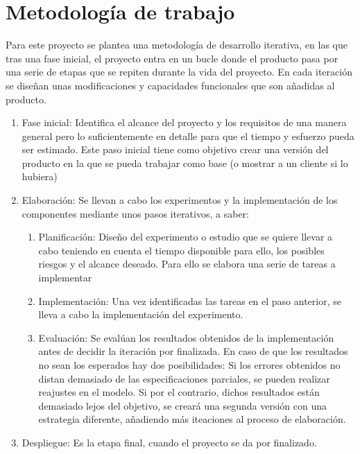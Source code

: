 \documentclass[11pt,a4paper,spanish]{book}
\begin{document}
	\section{Metodología de trabajo}
	Para este proyecto se plantea una metodología de desarrollo iterativa, en las que tras una fase inicial, el proyecto entra en un bucle donde el producto pasa por una serie de etapas que se repiten durante la vida del proyecto. En cada iteración se diseñan unas modificaciones y capacidades funcionales que son añadidas al producto.
	
	\begin{enumerate}
		\item Fase inicial: Identifica el alcance del proyecto y los requisitos de una manera general pero lo suficientemente en detalle para que el tiempo y esfuerzo pueda ser estimado. Este paso inicial tiene como objetivo crear una versión del producto en la que se pueda trabajar como base (o mostrar a un cliente si lo hubiera)
		
		\item Elaboración: Se llevan a cabo los experimentos y la implementación de los componentes mediante unos pasos iterativos, a saber:
		
			\begin{enumerate}
				\item Planificación: Diseño del experimento o estudio que se quiere llevar a cabo teniendo en cuenta el tiempo disponible para ello, los posibles riesgos y el alcance deseado. Para ello se elabora una serie de tareas a implementar
				
				\item Implementación: Una vez identificadas las tareas en el paso anterior, se lleva a cabo la implementación del experimento.
				
				\item Evaluación: Se evalúan los resultados obtenidos de la implementación antes de decidir la iteración por finalizada. En caso de que los resultados no sean los esperados hay dos posibilidades: Si los errores obtenidos no distan demasiado de las especificaciones parciales, se pueden realizar reajustes en el modelo. Si por el contrario, dichos resultados están demasiado lejos del objetivo, se creará una segunda versión con una estrategia diferente, añadiendo más iteaciones al proceso de elaboración.
			\end{enumerate} 
		
		\item Despliegue: Es la etapa final, cuando el proyecto se da por finalizado.
	\end{enumerate}
\end{document}
